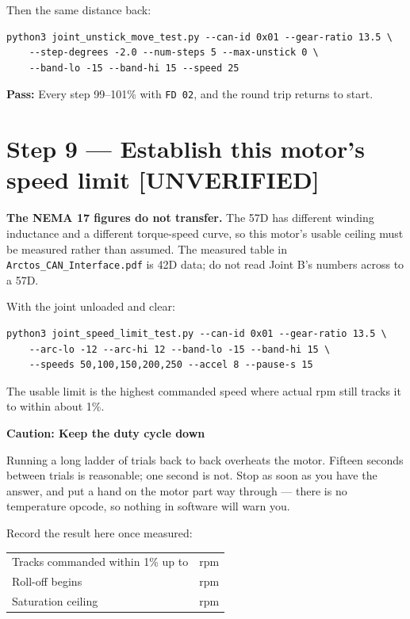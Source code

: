 \documentclass[11pt,letterpaper]{article}
\newenvironment{caution}[1]{%
    \par\addvspace{8pt}%
    \noindent{\color{cautionred}\rule{\linewidth}{0.8pt}}\par\vspace{2pt}
    \noindent\textbf{\color{cautionred}Caution: #1}\par\vspace{2pt}
}{%
    \par\vspace{2pt}\noindent{\color{cautionred}\rule{\linewidth}{0.4pt}}%
    \par\addvspace{8pt}%
}
\newcommand{\unverified}{{\color{unverifiedorange}\textbf{[UNVERIFIED]}}}
\newcommand{\passif}[1]{\par\vspace{2pt}\noindent\textbf{\color{okgreen}Pass:} #1\par\vspace{4pt}}
\begin{document}
Then the same distance back:

\begin{lstlisting}
python3 joint_unstick_move_test.py --can-id 0x01 --gear-ratio 13.5 \
    --step-degrees -2.0 --num-steps 5 --max-unstick 0 \
    --band-lo -15 --band-hi 15 --speed 25
\end{lstlisting}

\passif{Every step 99--101\% with \texttt{FD 02}, and the round trip returns to
start.}

\section*{Step 9 --- Establish this motor's speed limit \unverified}

\textbf{The NEMA 17 figures do not transfer.} The 57D has different winding
inductance and a different torque-speed curve, so this motor's usable ceiling must
be measured rather than assumed. The measured table in
\texttt{Arctos\_CAN\_Interface.pdf} is 42D data; do not read Joint B's numbers
across to a 57D.

With the joint unloaded and clear:

\begin{lstlisting}
python3 joint_speed_limit_test.py --can-id 0x01 --gear-ratio 13.5 \
    --arc-lo -12 --arc-hi 12 --band-lo -15 --band-hi 15 \
    --speeds 50,100,150,200,250 --accel 8 --pause-s 15
\end{lstlisting}

The usable limit is the highest commanded speed where actual rpm still tracks it to
within about 1\%.

\begin{caution}{Keep the duty cycle down}
Running a long ladder of trials back to back overheats the motor. Fifteen seconds
between trials is reasonable; one second is not. Stop as soon as you have the
answer, and put a hand on the motor part way through --- there is no temperature
opcode, so nothing in software will warn you.
\end{caution}

Record the result here once measured:

\begin{center}
\begin{tabular}{ll}
\toprule
Tracks commanded within 1\% up to & \underline{\hspace{3cm}} rpm \\
Roll-off begins                   & \underline{\hspace{3cm}} rpm \\
Saturation ceiling                & \underline{\hspace{3cm}} rpm \\
\bottomrule
\end{tabular}
\end{center}
\end{document}
